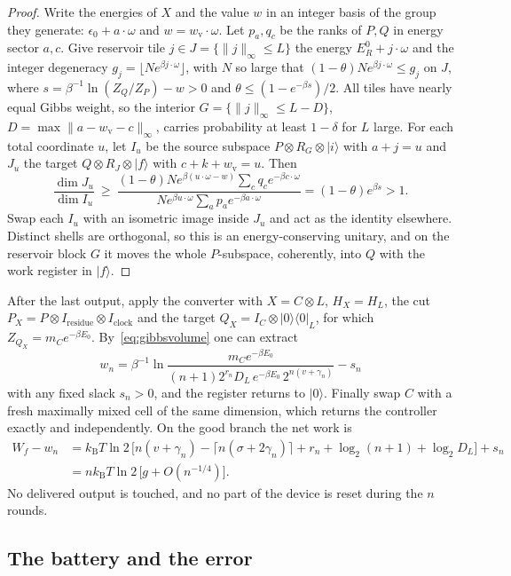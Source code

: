 \documentclass[11pt]{article}
\theoremstyle{definition}
\theoremstyle{remark}
\newcommand{\kB}{k_{\mathrm B}}
\begin{document}
\begin{proof}
Write the energies of $X$ and the value $w$ in an integer basis of the group they generate: $\epsilon_0+a\cdot\omega$ and $w=w_{\mathrm v}\cdot\omega$. Let $p_a,q_c$ be the ranks of $P,Q$ in energy sector $a,c$. Give reservoir tile $j\in J=\{\|j\|_\infty\le L\}$ the energy $E_R^0+j\cdot\omega$ and the integer degeneracy $g_j=\lfloor Ne^{\beta j\cdot\omega}\rfloor$, with $N$ so large that $(1-\theta)Ne^{\beta j\cdot\omega}\le g_j$ on $J$, where $s=\beta^{-1}\ln(Z_Q/Z_P)-w>0$ and $\theta\le(1-e^{-\beta s})/2$. All tiles have nearly equal Gibbs weight, so the interior $G=\{\|j\|_\infty\le L-D\}$, $D=\max\|a-w_{\mathrm v}-c\|_\infty$, carries probability at least $1-\delta$ for $L$ large. For each total coordinate $u$, let $I_u$ be the source subspace $P\otimes R_G\otimes|i\rangle$ with $a+j=u$ and $J_u$ the target $Q\otimes R_J\otimes|f\rangle$ with $c+k+w_{\mathrm v}=u$. Then
\[
\frac{\dim J_u}{\dim I_u}\ \ge\ \frac{(1-\theta)Ne^{\beta(u\cdot\omega-w)}\sum_cq_ce^{-\beta c\cdot\omega}}{Ne^{\beta u\cdot\omega}\sum_ap_ae^{-\beta a\cdot\omega}}=(1-\theta)e^{\beta s}>1.
\]
Swap each $I_u$ with an isometric image inside $J_u$ and act as the identity elsewhere. Distinct shells are orthogonal, so this is an energy-conserving unitary, and on the reservoir block $G$ it moves the whole $P$-subspace, coherently, into $Q$ with the work register in $|f\rangle$.
\end{proof}

After the last output, apply the converter with $X=C\otimes L$, $H_X=H_L$, the cut $P_X=P\otimes I_{\mathrm{residue}}\otimes I_{\mathrm{clock}}$ and the target $Q_X=I_C\otimes|0\rangle\langle0|_L$, for which $Z_{Q_X}=m_Ce^{-\beta E_0}$. By~\eqref{eq:gibbsvolume} one can extract
\[
w_n=\beta^{-1}\ln\frac{m_Ce^{-\beta E_0}}{(n+1)2^{r_n}D_L\,e^{-\beta E_0}\,2^{n(v+\gamma_n)}}-s_n
\]
with any fixed slack $s_n>0$, and the register returns to $|0\rangle$. Finally swap $C$ with a fresh maximally mixed cell of the same dimension, which returns the controller exactly and independently. On the good branch the net work is
\begin{align*}
W_f-w_n&=\kB T\ln2\,\bigl[n(v+\gamma_n)-\lceil n(\sigma+2\gamma_n)\rceil+r_n+\log_2(n+1)+\log_2D_L\bigr]+s_n\\
&=n\kB T\ln2\,\bigl[g+O(n^{-1/4})\bigr].
\end{align*}
No delivered output is touched, and no part of the device is reset during the $n$ rounds.

\subsection{The battery and the error}
\end{document}
